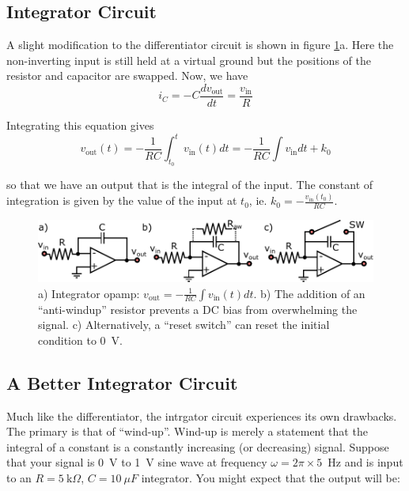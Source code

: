 \documentclass{tufte-book}
\begin{document}
\subsection{Integrator Circuit}
A slight modification to the differentiator circuit is shown in figure \ref{fig:integrator_opamp}a. Here the non-inverting input is still held at a virtual ground but the positions of the resistor and capacitor are swapped. Now, we have
$$
i_C = -C\frac{dv_\text{out}}{dt} = \frac{v_\text{in}}{R}
$$

Integrating this equation gives
\begin{equation}
\label{eq:opamp_integrator}
v_\text{out}(t) = -\frac{1}{RC}\int_{t_0}^{t}v_\text{in}(t)dt =  -\frac{1}{RC}\int v_\text{in}dt + k_0
\end{equation}

\noindent so that we have an output that is the integral of the input. The constant of integration is given by the value of the input at $t_0$, ie. $k_0 = -\frac{v_\text{in}(t_0)}{RC}$.

\begin{figure}[ht]
\caption{a) Integrator opamp: $v_\text{out} = -\frac{1}{RC}\int v_\text{in}(t)dt$. b) The addition of an ``anti-windup'' resistor prevents a DC bias from overwhelming the signal. c) Alternatively, a ``reset switch'' can reset the initial condition to 0~V.}
\label{fig:integrator_opamp}
	\begin{center}
		\includegraphics[width = \textwidth]{Images/integrator_opamp.pdf}
	\end{center}
\end{figure}

\subsection{A Better Integrator Circuit}
Much like the differentiator, the intrgator circuit experiences its own drawbacks. The primary is that of ``wind-up''. Wind-up is merely a statement that the integral of a constant is a constantly increasing (or decreasing) signal. Suppose that your signal is 0~V to 1~V sine wave at frequency $\omega = 2\pi\times5$~Hz and is input to an $R =  5~\text{k}\Omega$, $C = 10~\mu F$ integrator. You might expect that the output will be:
\end{document}
